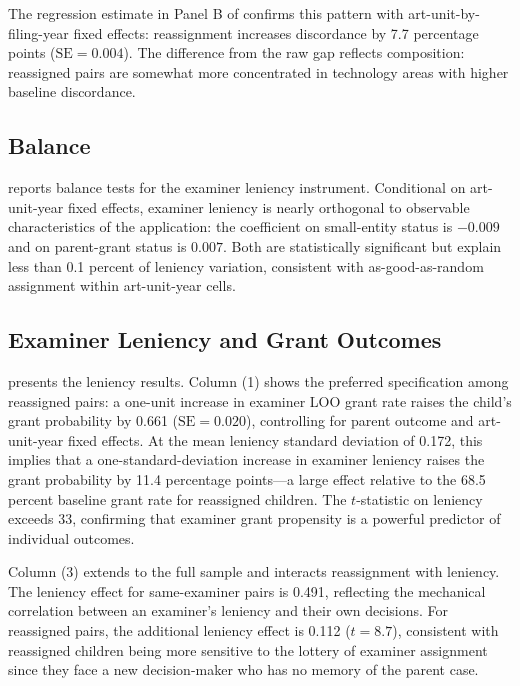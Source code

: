 \documentclass[12pt]{article}
\begin{document}
The regression estimate in Panel B of  confirms this pattern with art-unit-by-filing-year fixed effects: reassignment increases discordance by 7.7 percentage points ($\text{SE} = 0.004$). The difference from the raw gap reflects composition: reassigned pairs are somewhat more concentrated in technology areas with higher baseline discordance.



\subsection{Balance}

 reports balance tests for the examiner leniency instrument. Conditional on art-unit-year fixed effects, examiner leniency is nearly orthogonal to observable characteristics of the application: the coefficient on small-entity status is $-0.009$ and on parent-grant status is $0.007$. Both are statistically significant but explain less than 0.1 percent of leniency variation, consistent with as-good-as-random assignment within art-unit-year cells.



\subsection{Examiner Leniency and Grant Outcomes}

 presents the leniency results. Column (1) shows the preferred specification among reassigned pairs: a one-unit increase in examiner LOO grant rate raises the child's grant probability by 0.661 ($\text{SE} = 0.020$), controlling for parent outcome and art-unit-year fixed effects. At the mean leniency standard deviation of 0.172, this implies that a one-standard-deviation increase in examiner leniency raises the grant probability by 11.4 percentage points---a large effect relative to the 68.5 percent baseline grant rate for reassigned children. The $t$-statistic on leniency exceeds 33, confirming that examiner grant propensity is a powerful predictor of individual outcomes.

Column (3) extends to the full sample and interacts reassignment with leniency. The leniency effect for same-examiner pairs is 0.491, reflecting the mechanical correlation between an examiner's leniency and their own decisions. For reassigned pairs, the additional leniency effect is 0.112 ($t = 8.7$), consistent with reassigned children being more sensitive to the lottery of examiner assignment since they face a new decision-maker who has no memory of the parent case.
\end{document}
